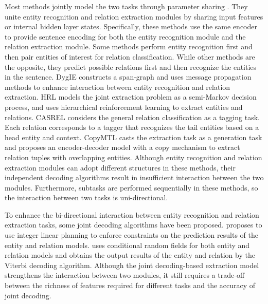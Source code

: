 \documentclass[sigconf]{acmart}
\begin{document}
Most methods jointly model the two tasks through parameter sharing \cite{miwa2016end, zheng2017joint}. They unite entity recognition and relation extraction modules by sharing input features or internal hidden layer states. Specifically, these methods use the same encoder to provide sentence encoding for both the entity recognition module and the relation extraction module. Some methods  \cite{bekoulis2018adversarial, luan2018multi, luan2019general, wadden2019entity} perform entity recognition first and then pair entities of interest for relation classification. While other methods  \cite{takanobu2019hierarchical, yuan2020relation} are the opposite, they predict possible relations first and then recognize the entities in the sentence.
DygIE \cite{luan2019general} constructs a span-graph and uses message propagation methods to enhance interaction between entity recognition and relation extraction. HRL \cite{takanobu2019hierarchical} models the joint extraction problem as a semi-Markov decision process, and uses hierarchical reinforcement learning to extract entities and relations.
CASREL \cite{wei2020novel} considers the general relation classification as a tagging task. Each relation corresponds to a tagger that recognizes the tail entities based on a head entity and context.
CopyMTL \cite{zeng2018extracting} casts the extraction task as a generation task and proposes an encoder-decoder model with a copy mechanism to extract relation tuples with overlapping entities.
Although entity recognition and relation extraction modules can adopt different structures in these methods, their independent decoding algorithms result in insufficient interaction between the two modules. Furthermore, subtasks are performed sequentially in these methods, so the interaction between two tasks is uni-directional.

To enhance the bi-directional interaction between entity recognition and relation extraction tasks, some joint decoding algorithms have been proposed. 
\cite{yang2013joint} proposes to use integer linear planning to enforce constraints on the prediction results of the entity and relation models.   
\cite{katiyar2016investigating} uses conditional random fields for both entity and relation models and obtains the output results of the entity and relation by the Viterbi decoding algorithm. Although the joint decoding-based extraction model strengthens the interaction between two modules, it still requires a trade-off between the richness of features required for different tasks and the accuracy of joint decoding. 
\end{document}

